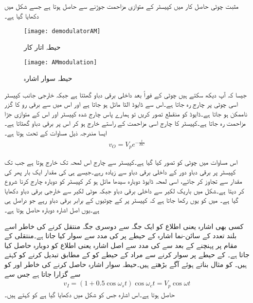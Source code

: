 مثبت چوٹی حاصل کار میں کپیسٹر کے متوازی مزاحمت جوڑنے سے   حاصل ہوتا ہے جسے شکل   میں دکھایا گیا ہے۔
\begin{figure}
\centering
\texttt{[image: demodulatorAM]}
\caption{حیطہ اتار کار}
\label{شکل_حیطہ_اتر_کار}
\end{figure}
%
\begin{figure}
\centering
\texttt{[image: AMmodulation]}
\caption{حیطہ سوار اشارہ}
\label{شکل_حیطہ_سوار_اشارہ}
\end{figure}
جیسا کہ آپ دیکھ سکتے ہیں چوٹی  کے  فوراً بعد داخلی برقی دباو گھٹتا ہے جبکہ خارجی جانب کپیسٹر اسی چوٹی پر چارج رہ جاتا ہے۔اس سے ڈایوڈ الٹا مائل ہو جاتا ہے اور اس میں سے برقی رو کا گزر ناممکن ہو جاتا ہے۔ڈایوڈ کو منقطع تصور کریں تو ہمارے پاس چارج شدہ کپیسٹر   اور اس کے متوازی جڑا مزاحمت  رہ جاتا ہے۔کپیسٹر کا چارج اسی مزاحمت کے راستے  خارج ہو کر اس پر برقی دباو گھٹاتا ہے۔ایسا مندرجہ ذیل مساوات کے تحت ہوتا ہے۔
\begin{align} \label{مساوات_حیطہ_اتار_کار_الف}
v_O=V_{p} e^{-\frac{t}{RC}}
\end{align}

اس مساوات میں چوٹی کو  تصور کیا گیا ہے۔کپیسٹر سے چارج اس لمحہ تک خارج ہوتا ہے جب تک کپیسٹر پر برقی دباو   دور کے داخلی برقی دباو   سے زیادہ رہے۔جیسے ہی کی مقدار ایک بار پھر کی مقدار سے تجاوز کر جائے، اسی لمحہ ڈایوڈ دوبارہ سیدھا مائل ہو کر کپیسٹر کو دوبارہ چارج کرنا شروع کر دیتا ہے۔شکل میں باریک لکیر سے داخلی برقی دباو جبکہ موٹی لکیر سے خارجی برقی دباو دکھایا گیا ہے۔ میں  کو یوں رکھا جاتا ہے کہ  کپیسٹر پر  کے چوٹیوں کے برابر برقی دباو رہے جو دراصل  ہی ہے۔یوں اصل اشارہ دوبارہ حاصل ہوتا ہے۔

کسی بھی اشارہ یعنی اطلاع   کو ایک جگہ سے دوسری جگہ منتقل کرنے کی خاطر اسے بلند تعدد کے سائن-نما اشارہ  کے حیطے پر  کی مدد سے سوار کیا جاتا ہے۔منتقلی کے مقام پر پہنچنے کے بعد  سے  کی مدد سے اصل اشارہ یعنی اطلاع کو  دوبارہ حاصل کیا جاتا ہے۔ کے حیطے پر سوار کرنے سے مراد  کے حیطے کو  کے مطابق تبدیل کرنے کو کہتے ہیں۔ کو مثال بناتے ہوئے آگے بڑھتے ہیں۔حیطہ سوار اشارہ حاصل کرنے کی خاطر  اور  کو  سے گزارا جاتا ہے جس سے 
\begin{align}\label{مساوات_ڈایوڈ_حیطہ_سوار_اشارہ}
v_I=\left(1+0.5 \cos \omega_s t \right) \cos \omega_c t=V_p \cos \omega t
\end{align}
حاصل ہوتا ہے۔اس اشارہ جس کو شکل  میں دکھایا گیا ہے کو   کہتے ہیں۔


